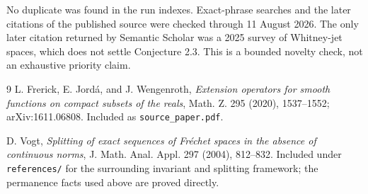 \documentclass[10pt]{article}
\begin{document}
No duplicate was found in the run indexes.  Exact-phrase searches and the
later citations of the published source were checked through 11 August 2026.
The only later citation returned by Semantic Scholar was a 2025 survey of
Whitney-jet spaces, which does not settle Conjecture 2.3.  This is a bounded
novelty check, not an exhaustive priority claim.

\begin{thebibliography}{9}
L. Frerick, E. Jord\'a, and J. Wengenroth,
\emph{Extension operators for smooth functions on compact subsets of the
reals}, Math. Z. 295 (2020), 1537--1552; arXiv:1611.06808.
Included as \texttt{source\_paper.pdf}.

D. Vogt, \emph{Splitting of exact sequences of Fr\'echet spaces in the
absence of continuous norms}, J. Math. Anal. Appl. 297 (2004), 812--832.
Included under \texttt{references/} for the surrounding invariant and
splitting framework; the permanence facts used above are proved directly.
\end{thebibliography}
\end{document}

